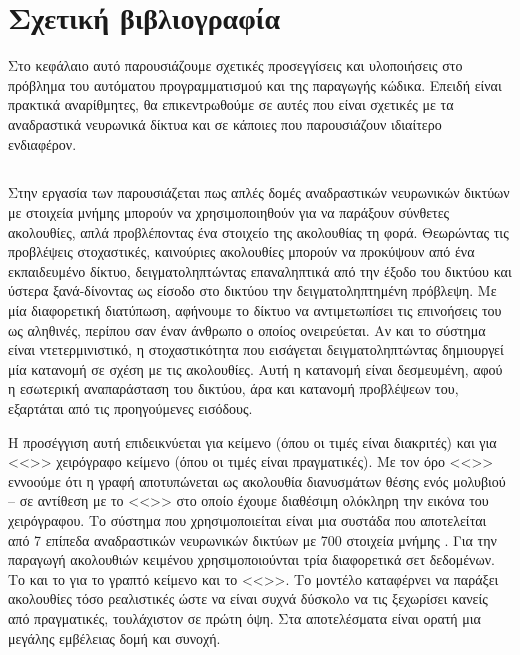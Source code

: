 \chapter{Σχετική βιβλιογραφία}

Στο κεφάλαιο αυτό παρουσιάζουμε σχετικές προσεγγίσεις και υλοποιήσεις στο πρόβλημα του αυτόματου προγραμματισμού και της παραγωγής κώδικα.
Επειδή είναι πρακτικά αναρίθμητες, θα επικεντρωθούμε σε αυτές που είναι σχετικές με τα αναδραστικά νευρωνικά δίκτυα και σε κάποιες που παρουσιάζουν ιδιαίτερο ενδιαφέρον.

\section{}
Στην εργασία των  \cite{Graves2013} παρουσιάζεται πως απλές δομές αναδραστικών νευρωνικών δικτύων με στοιχεία μνήμης  μπορούν να χρησιμοποιηθούν για να παράξουν σύνθετες ακολουθίες, απλά προβλέποντας ένα στοιχείο της ακολουθίας τη φορά. 
Θεωρώντας τις προβλέψεις στοχαστικές, καινούριες ακολουθίες μπορούν να προκύψουν από ένα εκπαιδευμένο δίκτυο, δειγματοληπτώντας επαναληπτικά από την έξοδο του δικτύου και ύστερα ξανά-δίνοντας ως είσοδο στο δικτύου την δειγματοληπτημένη πρόβλεψη.
Με μία διαφορετική διατύπωση, αφήνουμε το δίκτυο να αντιμετωπίσει τις επινοήσεις του ως αληθινές, περίπου σαν έναν άνθρωπο ο οποίος ονειρεύεται. 
Αν και το σύστημα είναι ντετερμινιστικό, η στοχαστικότητα που εισάγεται δειγματοληπτώντας δημιουργεί μία κατανομή σε σχέση με τις ακολουθίες.
Αυτή η κατανομή είναι δεσμευμένη, αφού η εσωτερική αναπαράσταση του δικτύου, άρα και κατανομή προβλέψεων του, εξαρτάται από τις προηγούμενες εισόδους.

Η προσέγγιση αυτή επιδεικνύεται για κείμενο (όπου οι τιμές είναι διακριτές) και για <<>>  χειρόγραφο κείμενο (όπου οι τιμές είναι πραγματικές).
Με τον όρο <<>> εννοούμε ότι η γραφή αποτυπώνεται ως ακολουθία διανυσμάτων θέσης ενός μολυβιού -- σε αντίθεση με το <<>> στο οποίο έχουμε διαθέσιμη ολόκληρη την εικόνα του χειρόγραφου.
Το σύστημα που χρησιμοποιείται είναι μια συστάδα που αποτελείται από 7 επίπεδα αναδραστικών νευρωνικών δικτύων με 700 στοιχεία μνήμης .
Για την παραγωγή ακολουθιών κειμένου χρησιμοποιούνται τρία διαφορετικά σετ δεδομένων. Το  και το  για το γραπτό κείμενο και το <<>>.
Το μοντέλο καταφέρνει να παράξει ακολουθίες τόσο ρεαλιστικές ώστε να είναι συχνά δύσκολο να τις ξεχωρίσει κανείς από πραγματικές, τουλάχιστον σε πρώτη όψη.
Στα αποτελέσματα είναι ορατή μια μεγάλης εμβέλειας δομή και συνοχή.


